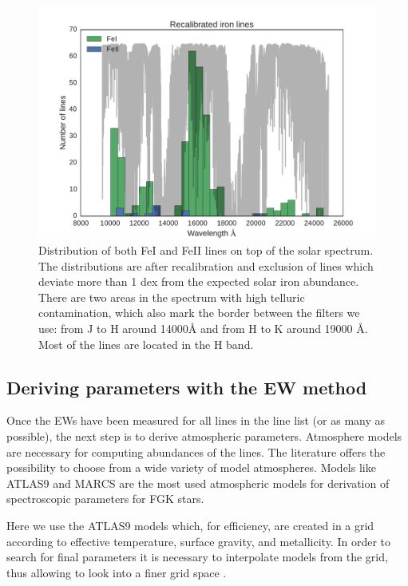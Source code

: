 \documentclass{aa}
\begin{document}
\begin{figure}[tpb]
    \centering
    \includegraphics[width=1.05\linewidth]{figures/EWvsEP_cut.pdf}
    \caption{Distribution of both FeI and FeII lines on top of the solar
    spectrum. The distributions are after recalibration and exclusion
    of lines which deviate more than 1 dex from the expected solar iron
    abundance. There are two areas in the spectrum with high telluric
    contamination, which also mark the border between the filters we
    use: from J to H around 14000\si{\angstrom} and from H to K around
    19000 \si{\angstrom}. Most of the lines are located in the H band.}
    \label{fig:Fe1_after_recal}
\end{figure}



\subsection{Deriving parameters with the EW method}
\label{sec:deriving_parameters_with_the_ew_method}

Once the EWs have been measured for all lines in the line list (or as
many as possible), the next step is to derive atmospheric parameters.
Atmosphere models are necessary for computing abundances of the lines.
The literature offers the possibility to choose from a wide variety
of model atmospheres. Models like ATLAS9 \citep{Kurucz1993} and
MARCS \citep{Gustafson2008} are the most used atmospheric models for
derivation of spectroscopic parameters for FGK stars.

Here we use the ATLAS9 models which, for efficiency, are created
in a grid according to effective temperature, surface gravity, and
metallicity. In order to search for final parameters it is necessary to
interpolate models from the grid, thus allowing to look into a finer
grid space \citep[see e.g.][]{Sousa2014}.
\end{document}
